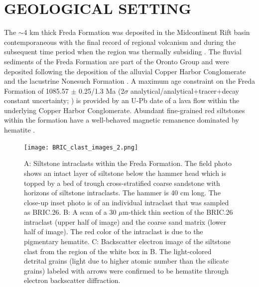 \documentclass[11pt,letterpaper]{article}
\begin{document}
\section*{GEOLOGICAL SETTING}

The $\sim$4 km thick Freda Formation was deposited in the Midcontinent Rift basin contemporaneous with the final record of regional volcanism and during the subsequent time period when the region was thermally subsiding \citep{Cannon1992a}. The fluvial sediments of the Freda Formation are part of the Oronto Group and were deposited following the deposition of the alluvial Copper Harbor Conglomerate and the lacustrine Nonesuch Formation \citep{Ojakangas2001a}. A maximum age constraint on the Freda Formation of 1085.57 $\pm$ 0.25/1.3 Ma (2$\sigma$ analytical/analytical+tracer+decay constant uncertainty; \citealp{Fairchild2017a}) is provided by an U-Pb date of a lava flow within the underlying Copper Harbor Conglomerate. Abundant fine-grained red siltstones within the formation have a well-behaved magnetic remanence dominated by hematite \citep{Henry1977a}.

\begin{figure}[!ht]
\centering
\noindent\texttt{[image: BRIC\_clast\_images\_2.png]}
\caption{\small{A: Siltstone intraclasts within the Freda Formation. The field photo shows an intact layer of siltstone below the hammer head which is topped by a bed of trough cross-stratified coarse sandstone with horizons of siltstone intraclasts. The hammer is 40 cm long. The close-up inset photo is of an individual intraclast that was sampled as BRIC.26. B: A scan of a 30 $\mu$m-thick thin section of the BRIC.26 intraclast (upper half of image) and the coarse sand matrix (lower half of image). The red color of the intraclast is due to the pigmentary hematite. C: Backscatter electron image of the siltstone clast from the region of the white box in B. The light-colored detrital grains (light due to higher atomic number than the silicate grains) labeled with arrows were confirmed to be hematite through electron backscatter diffraction.}}
\label{fig:intraclast_images}
\end{figure}
\end{document}

